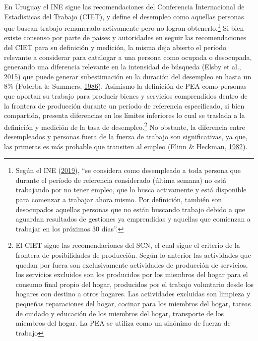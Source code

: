 \documentclass[12pt,oneside]{reedthesis}
\begin{document}
En Uruguay el INE sigue las recomendaciones del Conferencia Internacional de Estadísticas del Trabajo (CIET), y define el desempleo como aquellas personas que buscan trabajo remunerado activamente pero no logran obtenerlo.\footnote{Según el INE (\protect\hyperlink{ref-INE2019}{2019}), ``se considera como desempleado a toda persona que durante el período de referencia considerado (última semana) no está trabajando por no tener empleo, que lo busca activamente y está disponible para comenzar a trabajar ahora mismo. Por definición, también son desocupados aquellas personas que no están buscando trabajo debido a que aguardan resultados de gestiones ya emprendidas y aquellas que comienzan a trabajar en los próximos 30 días''.} Si bien existe consenso por parte de países y autoridades en seguir las recomendaciones del CIET para su definición y medición, la misma deja abierto el período relevante a considerar para catalogar a una persona como ocupada o desocupada, generando una diferencia relevante en la intensidad de búsqueda (Elsby et al., \protect\hyperlink{ref-Elsby2015}{2015}) que puede generar subestimación en la duración del desempleo en hasta un 8\% (Poterba \& Summers, \protect\hyperlink{ref-Poterba1986}{1986}). Asimismo la definición de PEA como personas que aportan su trabajo para producir bienes y servicios comprendidos dentro de la frontera de producción durante un periodo de referencia especificado, si bien compartida, presenta diferencias en los límites inferiores lo cual se traslada a la definición y medición de la tasa de desempleo.\footnote{El CIET sigue las recomendaciones del SCN, el cual sigue el criterio de la frontera de posibilidades de producción. Según lo anterior las actividades que quedan por fuera son exclusivamente actividades de producción de servicios, los servicios excluidos son los producidos por los miembros del hogar para el consumo final propio del hogar, producidos por el trabajo voluntario desde los hogares con destino a otros hogares. Las actividades excluidas son limpieza y pequeñas reparaciones del hogar, cocinar para los miembros del hogar, tareas de cuidado y educación de los miembros del hogar, transporte de los miembros del hogar. La PEA se utiliza como un sinónimo de fuerza de trabajo} No obstante, la diferencia entre desempleados y personas fuera de la fuerza de trabajo son significativas, ya que, las primeras es más probable que transiten al empleo (Flinn \& Heckman, \protect\hyperlink{ref-Flinn1982}{1982}).
\end{document}
